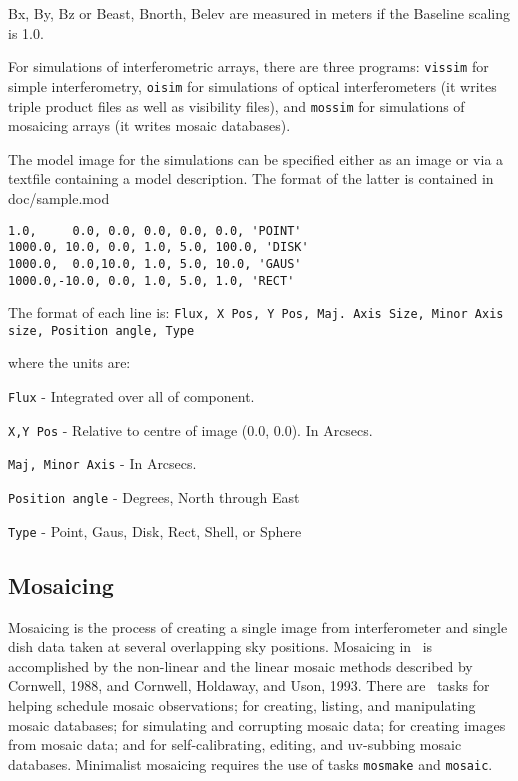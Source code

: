 Bx, By, Bz or Beast, Bnorth, Belev are measured in meters if
the Baseline scaling is 1.0.

For simulations of interferometric arrays, there are three programs:
{\tt vissim} for simple interferometry, {\tt oisim} for simulations of
optical interferometers (it writes triple product files as well as
visibility files), and {\tt mossim} for simulations of mosaicing
arrays (it writes mosaic databases).

The model image for the simulations can be specified either as
an image or via a textfile containing a model description. The format
of the latter is contained in doc/sample.mod

\begin{verbatim}
1.0,     0.0, 0.0, 0.0, 0.0, 0.0, 'POINT'
1000.0, 10.0, 0.0, 1.0, 5.0, 100.0, 'DISK'
1000.0,  0.0,10.0, 1.0, 5.0, 10.0, 'GAUS'
1000.0,-10.0, 0.0, 1.0, 5.0, 1.0, 'RECT'
\end{verbatim}

The format of each line is:
{\tt Flux, X Pos, Y Pos, Maj. Axis Size, Minor Axis size, Position angle, 
Type}

where the units are:

{\tt Flux} - Integrated over all of component.

{\tt X,Y Pos} - Relative to centre of image (0.0, 0.0). In Arcsecs.

{\tt Maj, Minor Axis} - In Arcsecs.

{\tt Position angle} - Degrees, North through East

{\tt Type} - Point, Gaus, Disk, Rect, Shell, or Sphere

\subsection{Mosaicing}

Mosaicing is the process of creating a single image from
interferometer and single dish data taken at several overlapping sky
positions.  Mosaicing in \sde\ is accomplished by the non-linear and the
linear mosaic methods described by Cornwell, 1988, and Cornwell,
Holdaway, and Uson, 1993.  There are \sde\ tasks for helping schedule
mosaic observations; for creating, listing, and manipulating mosaic
databases; for simulating and corrupting mosaic data; for creating
images from mosaic data; and for self-calibrating, editing, and
uv-subbing mosaic databases.  Minimalist mosaicing requires the
use of tasks {\tt mosmake} and {\tt mosaic}.

